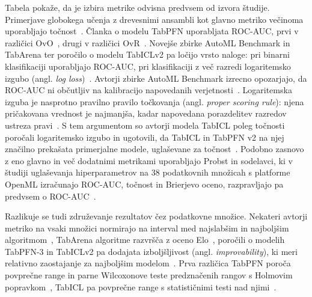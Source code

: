 \documentclass[a4paper,12pt,openright]{book}
\begin{document}

Tabela pokaže, da je izbira metrike odvisna predvsem od izvora študije.
Primerjave globokega učenja z drevesnimi ansambli kot glavno metriko večinoma
uporabljajo točnost~\cite{grinsztajn2022why,mcelfresh2023neural,ye2024closer}.
Članka o modelu TabPFN uporabljata ROC-AUC, prvi v različici
OvO~\cite{hollmann2023tabpfn}, drugi v različici
OvR~\cite{hollmann2025tabpfn}. Novejše zbirke AutoML Benchmark in TabArena ter
poročilo o modelu TabICLv2 pa ločijo vrsto naloge: pri binarni klasifikaciji
uporabljajo ROC-AUC, pri klasifikaciji z več razredi logaritemsko izgubo
(angl. \emph{log
loss})~\cite{gijsbers2024amlb,erickson2025tabarena,qu2026tabiclv2}. Avtorji
zbirke AutoML Benchmark izrecno opozarjajo, da ROC-AUC ni občutljiv na
kalibracijo napovedanih
verjetnosti~\cite{gijsbers2024amlb}. Logaritemska
izguba je nasprotno pravilno pravilo točkovanja (angl. \emph{proper scoring
rule}): njena pričakovana vrednost je najmanjša, kadar napovedana porazdelitev
razredov ustreza pravi~\cite{gneiting2007strictly}. S tem argumentom so avtorji
modela TabICL poleg točnosti poročali logaritemsko izgubo in ugotovili, da
TabICL in TabPFN v2 na njej značilno prekašata primerjalne modele, uglaševane
za točnost~\cite{qu2025tabicl}. Podobno zasnovo z eno glavno in več dodatnimi
metrikami uporabljajo Probst in sodelavci, ki v študiji uglaševanja
hiperparametrov na 38 podatkovnih množicah s platforme OpenML izračunajo
ROC-AUC, točnost in Brierjevo oceno, razpravljajo pa predvsem o
ROC-AUC~\cite{probst2019tunability}.

Razlikuje se tudi združevanje rezultatov čez podatkovne množice. Nekateri
avtorji metriko na vsaki množici normirajo na interval med najslabšim in
najboljšim algoritmom~\cite{grinsztajn2022why,hollmann2025tabpfn}, TabArena
algoritme razvršča z oceno Elo~\cite{erickson2025tabarena}, poročili o modelih
TabPFN-3 in TabICLv2 pa dodajata izboljšljivost (angl. \emph{improvability}),
ki meri relativno zaostajanje za najboljšim
modelom~\cite{grinsztajn2026tabpfn3,qu2026tabiclv2}. Prva različica TabPFN poroča povprečne
range in parne Wilcoxonove teste predznačenih rangov s Holmovim popravkom~\cite{hollmann2023tabpfn},
TabICL pa povprečne range s statističnimi testi nad njimi~\cite{qu2025tabicl}.
\end{document}
